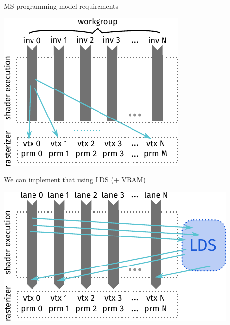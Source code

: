 \documentclass[aspectratio=169,t,xcolor=table]{beamer}
\begin{document}
\begin{frame}{MS programming model requirements}

    \LARGE

    \begin{center}
        \includegraphics{figs/ms_model.svg.pdf}
    \end{center}

\end{frame}

\begin{frame}{We can implement that using LDS (+ VRAM)}

    \LARGE

    \begin{center}
        \includegraphics{figs/ms_ngg_lds.svg.pdf}
    \end{center}

\end{frame}
\end{document}
